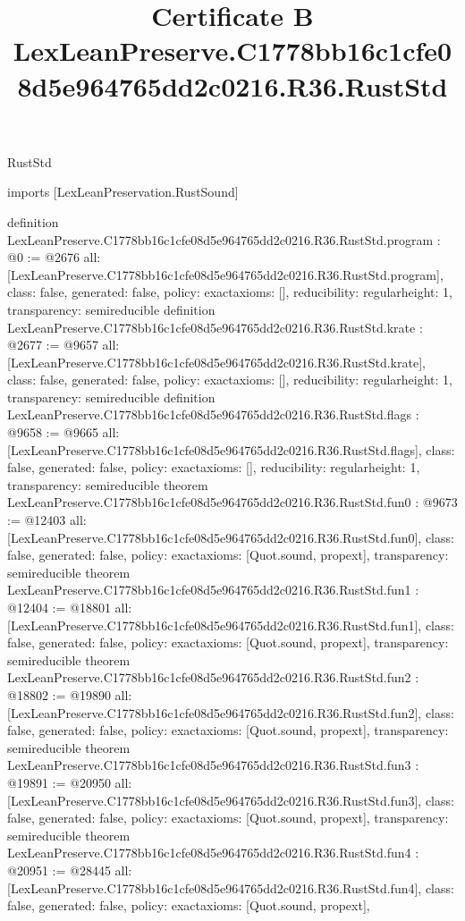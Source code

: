 \begin{lexlean}{RustStd}
\title{Certificate B LexLeanPreserve.C1778bb16c1cfe08d5e964765dd2c0216.R36.RustStd}
\begin{coremodule}
imports [LexLeanPreservation.RustSound]

definition LexLeanPreserve.C1778bb16c1cfe08d5e964765dd2c0216.R36.RustStd.program : @0 := @2676 {
  all: [LexLeanPreserve.C1778bb16c1cfe08d5e964765dd2c0216.R36.RustStd.program],
  class: false,
  generated: false,
  policy: exact{axioms: []},
  reducibility: regular{height: 1},
  transparency: semireducible
}
definition LexLeanPreserve.C1778bb16c1cfe08d5e964765dd2c0216.R36.RustStd.krate : @2677 := @9657 {
  all: [LexLeanPreserve.C1778bb16c1cfe08d5e964765dd2c0216.R36.RustStd.krate],
  class: false,
  generated: false,
  policy: exact{axioms: []},
  reducibility: regular{height: 1},
  transparency: semireducible
}
definition LexLeanPreserve.C1778bb16c1cfe08d5e964765dd2c0216.R36.RustStd.flags : @9658 := @9665 {
  all: [LexLeanPreserve.C1778bb16c1cfe08d5e964765dd2c0216.R36.RustStd.flags],
  class: false,
  generated: false,
  policy: exact{axioms: []},
  reducibility: regular{height: 1},
  transparency: semireducible
}
theorem LexLeanPreserve.C1778bb16c1cfe08d5e964765dd2c0216.R36.RustStd.fun0 : @9673 := @12403 {
  all: [LexLeanPreserve.C1778bb16c1cfe08d5e964765dd2c0216.R36.RustStd.fun0],
  class: false,
  generated: false,
  policy: exact{axioms: [Quot.sound, propext]},
  transparency: semireducible
}
theorem LexLeanPreserve.C1778bb16c1cfe08d5e964765dd2c0216.R36.RustStd.fun1 : @12404 := @18801 {
  all: [LexLeanPreserve.C1778bb16c1cfe08d5e964765dd2c0216.R36.RustStd.fun1],
  class: false,
  generated: false,
  policy: exact{axioms: [Quot.sound, propext]},
  transparency: semireducible
}
theorem LexLeanPreserve.C1778bb16c1cfe08d5e964765dd2c0216.R36.RustStd.fun2 : @18802 := @19890 {
  all: [LexLeanPreserve.C1778bb16c1cfe08d5e964765dd2c0216.R36.RustStd.fun2],
  class: false,
  generated: false,
  policy: exact{axioms: [Quot.sound, propext]},
  transparency: semireducible
}
theorem LexLeanPreserve.C1778bb16c1cfe08d5e964765dd2c0216.R36.RustStd.fun3 : @19891 := @20950 {
  all: [LexLeanPreserve.C1778bb16c1cfe08d5e964765dd2c0216.R36.RustStd.fun3],
  class: false,
  generated: false,
  policy: exact{axioms: [Quot.sound, propext]},
  transparency: semireducible
}
theorem LexLeanPreserve.C1778bb16c1cfe08d5e964765dd2c0216.R36.RustStd.fun4 : @20951 := @28445 {
  all: [LexLeanPreserve.C1778bb16c1cfe08d5e964765dd2c0216.R36.RustStd.fun4],
  class: false,
  generated: false,
  policy: exact{axioms: [Quot.sound, propext]},
}
\end{coremodule}
\end{lexlean}
